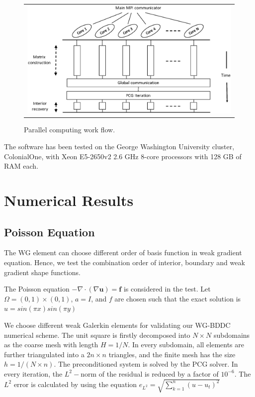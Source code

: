 \begin{figure}[h]
	\centering
	\begin{tabular}{c}
		\includegraphics[width=1.0\textwidth]{./pics/mpi_flow.eps}
	\end{tabular}
	\caption{\footnotesize Parallel computing work flow.}\label{fig6: mpi}
\end{figure}
The software has been tested on the George Washington University cluster, ColonialOne, with Xeon E5-2650v2 2.6 GHz 8-core processors with 128 GB of RAM each.

\section{Numerical Results}

\subsection{Poisson Equation}
The WG element can choose different order of basis function in weak gradient equation. Hence, we test the combination order of interior, boundary and weak gradient shape functions. 

The Poisson equation $ -\nabla \cdot (\nabla \mathbf{u}) = \mathbf{f} $ is considered in the test. Let $ \Omega = (0, 1) \times (0, 1) $, $ a = I $, and $ f $ are chosen such that the exact solution is $ u = sin(\pi x) sin(\pi y) $

We choose different weak Galerkin elements for validating our WG-BDDC numerical scheme. The unit square is firstly decomposed into $ N \times N $ subdomains as the coarse mesh with length $ H = 1 / N $. In every subdomain, all elements are further triangulated into a $ 2 n \times n $ triangles, and the finite mesh has the size $ h = 1/(N\times n) $. The preconditioned system is solved by the PCG solver. In every iteration, the $ L^2- $norm of the residual is reduced by a factor of $ 10^{-6} $. The $ L^{2} $ error is calculated by using the equation $ e_{L^{2}} = \sqrt{\sum_{k = 1}^{n} (u - u_{t})^{2} } $

